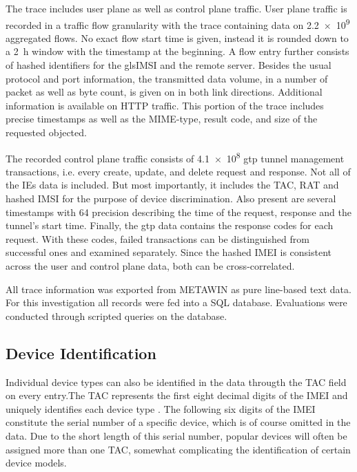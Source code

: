 The trace includes user plane as well as control plane traffic. User plane traffic is recorded in a traffic flow granularity with the trace containing data on \num{2.2e9} aggregated flows. No exact flow start time is given, instead it is rounded down to a \SI{2}{\hour} window with the timestamp at the beginning. A flow entry further consists of hashed identifiers for the gls{IMSI} and the remote server. Besides the usual protocol and port information, the transmitted data volume, in a number of packet as well as byte count, is given on in both link directions. Additional information is available on \gls{HTTP} traffic. This portion of the trace includes precise timestamps as well as the \acrshort{MIME}-type, result code, and size of the requested objected.

The recorded control plane traffic consists of \num{4.1e8} \gls{gtp} tunnel management transactions, i.e. every create, update, and delete request and response. Not all of the \glspl{IE} data is included. But most importantly, it includes the \gls{TAC}, \gls{RAT} and hashed \gls{IMSI} for the purpose of device discrimination. Also present are several timestamps with \SI{64}{\bit} precision describing the time of the request, response and the tunnel's start time. Finally, the \gls{gtp} data contains the response codes for each request. With these codes, failed transactions can be distinguished from successful ones and examined separately. Since the hashed \gls{IMEI} is consistent across the user and control plane data, both can be cross-correlated.

All trace information was exported from \gls{METAWIN} as pure line-based text data. For this investigation all records were fed into a \acrshort{SQL} database. Evaluations were conducted through scripted queries on the database.  

\subsection{Device Identification}

Individual device types can also be identified in the data througth the \gls{TAC} field on every entry.The \gls{TAC} represents the first eight decimal digits of the \gls{IMEI} and uniquely identifies each device type \cite{3gpp.23.003}. The following six digits of the \gls{IMEI} constitute the serial number of a specific device, which is of course omitted in the data. Due to the short length of this serial number, popular devices will often be assigned more than one \gls{TAC}, somewhat complicating the identification of certain device models.

